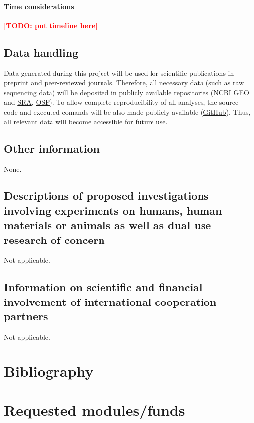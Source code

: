 \documentclass{scrartcl}
\newcommand{\todo}[1]{\xspace{\textcolor{red}{\bfseries[TODO: #1]}}\xspace}
\begin{document}
\paragraph*{Time considerations}
\todo{put timeline here}

\subsection{Data handling}
Data generated during this project will be used for scientific publications in
preprint and peer-reviewed journals. Therefore, all necessary data (such as raw
sequencing data) will be deposited in publicly available repositories
(\href{https://www.ncbi.nlm.nih.gov/geo/}{NCBI GEO} and
\href{https://www.ncbi.nlm.nih.gov/sra}{SRA}, \href{https://osf.io/}{OSF}). To
allow complete reproducibility of all analyses, the source code and executed
comands will be also made publicly available
(\href{https://github.com/}{GitHub}).  Thus, all relevant data will become
accessible for future use. 

\subsection{Other information}
None.

\subsection{Descriptions of proposed investigations involving experiments on humans, human materials or animals as well as dual use research of concern}
Not applicable.

\subsection{Information on scientific and financial involvement of international cooperation partners}
Not applicable.


\section{Bibliography}
\label{sec:bib}
\printbibliography[notcategory=reviewed, notcategory=nonreviewed, notcategory=patents_pending, notcategory=patents, heading=none]

\section{Requested modules/funds}
\end{document}
